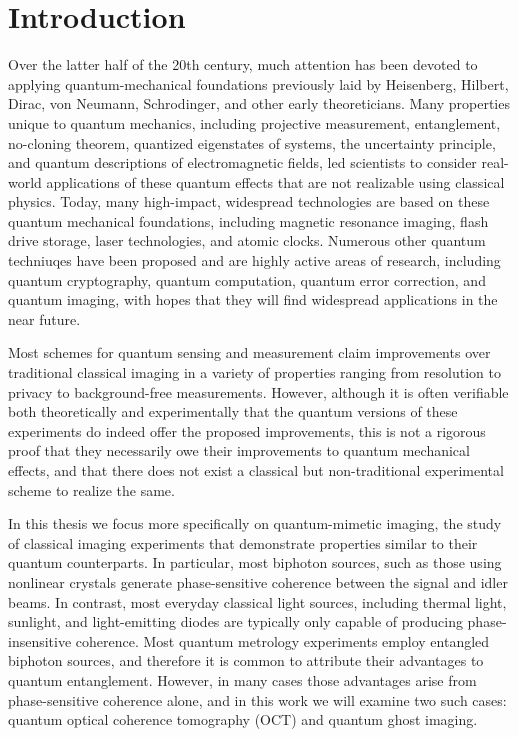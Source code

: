 \chapter{Introduction}
Over the latter half of the 20th century, much attention has been devoted to applying quantum-mechanical foundations previously laid by Heisenberg, Hilbert, Dirac, von Neumann, Schrodinger, and other early theoreticians. Many properties unique to quantum mechanics, including projective measurement, entanglement, no-cloning theorem, quantized eigenstates of systems, the uncertainty principle, and quantum descriptions of electromagnetic fields, led scientists to consider real-world applications of these quantum effects that are not realizable using classical physics. Today, many high-impact, widespread technologies are based on these quantum mechanical foundations, including magnetic resonance imaging, flash drive storage, laser technologies, and atomic clocks. Numerous other quantum techniuqes have been proposed and are highly active areas of research, including quantum cryptography, quantum computation, quantum error correction, and quantum imaging, with hopes that they will find widespread applications in the near future.

Most schemes for quantum sensing and measurement claim improvements over traditional classical imaging in a variety of properties ranging from resolution to privacy to background-free measurements. However, although it is often verifiable both theoretically and experimentally that the quantum versions of these experiments do indeed offer the proposed improvements, this is not a rigorous proof that they necessarily owe their improvements to quantum mechanical effects, and that there does not exist a classical but non-traditional experimental scheme to realize the same.

In this thesis we focus more specifically on quantum-mimetic imaging, the study of classical imaging experiments that demonstrate properties similar to their quantum counterparts. In particular, most biphoton sources, such as those using nonlinear crystals generate phase-sensitive coherence between the signal and idler beams. In contrast, most everyday classical light sources, including thermal light, sunlight, and light-emitting diodes are typically only capable of producing phase-insensitive coherence. Most quantum metrology experiments employ entangled biphoton sources, and therefore it is common to attribute their advantages to quantum entanglement. However, in many cases those advantages arise from phase-sensitive coherence alone, and in this work we will examine two such cases: quantum optical coherence tomography (OCT) and quantum ghost imaging.

